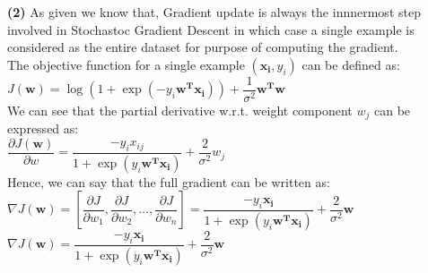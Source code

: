 \documentclass[11pt]{article}
\renewcommand\part[1]{\vspace{.10in}\textbf{(#1)}}
\begin{document}
\part{2}
As given we know that, Gradient update is always the innnermost step involved in Stochastoc Gradient Descent in which case a single example is considered as the entire dataset for purpose of computing the gradient.\\ 
The objective function for a single example $(\mathbf{x_i},y_i)$ can be defined as:\\
$J(\mathbf{w}) = \log(1 + \exp(-y_i\mathbf{w^Tx_i})) + \dfrac{1}{\sigma^2}\mathbf{w^Tw}$\\
We can see that the partial derivative w.r.t. weight component $w_j$ can be expressed as:\\
$\dfrac{\partial J(\mathbf{w})}{\partial w} = \dfrac{-y_ix_{ij}}{1 + \exp(y_i\mathbf{w^Tx_i})} + \dfrac{2}{\sigma^2}w_j$\\
Hence, we can say that the full gradient can be written as:\\
$\nabla J(\mathbf{w}) = [\dfrac{\partial J}{\partial w_1},\dfrac{\partial J}{\partial w_2}, \dots, \dfrac{\partial J}{\partial w_n}] = \dfrac{-y_i\mathbf{x_i}}{1 + \exp(y_i\mathbf{w^Tx_i})} + \dfrac{2}{\sigma^2}\mathbf{w}$\\
$\nabla J(\mathbf{w}) = \dfrac{-y_i\mathbf{x_i}}{1 + \exp(y_i\mathbf{w^Tx_i})} + \dfrac{2}{\sigma^2}\mathbf{w}$\\
\end{document}
